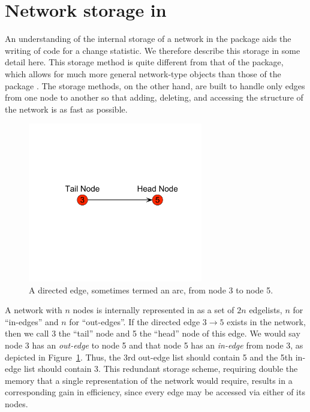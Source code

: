\documentclass[nojss]{jss}
\begin{document}
\section[Network storage in ergm]{Network storage in }
\label{networkstorage}

An understanding of the internal storage of a network in the  package
aids the writing of code for a change statistic. We therefore
describe this storage in some detail here.
This storage method is quite different from that of the  package,
which allows for much more general network-type objects
than those of the  package \citep{networkjss}.
The  storage methods, on the other hand, are built to
handle only edges from one node to another
so that adding, deleting, and accessing the structure of the network is as
fast as possible.

\begin{figure}[h!]
\centerline{\includegraphics[width=3in]{twonode.pdf}}
\caption{A directed edge, sometimes termed an arc, from
node 3 to node 5.}\label{directededge}
\end{figure}

A network
with $n$ nodes is internally represented in  as a set of $2n$ edgelists,
$n$ for ``in-edges'' and $n$ for ``out-edges''.  If the directed edge
$3\!\!\longrightarrow\!\!5$ exists in the network,
then we call 3 the ``tail'' node and 5 the ``head'' node of this edge.  We would say node 3 
has an {\em out-edge} to node 5 and that node 5 has an {\em in-edge} from node 3, as depicted in
Figure~\ref{directededge}.  Thus, the 3rd out-edge list
should contain 5 and the 5th in-edge list should contain 3.  This redundant storage
scheme, requiring double the memory that a single representation of the network
would require, results in a corresponding gain in efficiency, since every edge
may be accessed via either of its nodes.
\end{document}
